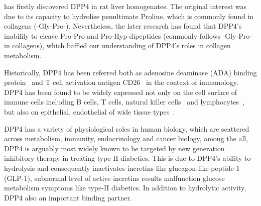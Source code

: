 \citet{Hopsu-Havu1966} has firstly discovered DPP4 in rat liver homogenates. The original interest was due to its capacity to hydrolise penultimate Proline, which is commonly found in collagens (-Gly-Pro-). Nevertheless, the later research has found that DPP4's inabilily to cleave Pro-Pro and Pro-Hyp dipeptides (commonly follows -Gly-Pro- in collagens), which baffled our understanding of DPP4's roles in collagen metabolism.
\par
Historically, DPP4 has been referred both as adenosine deaminase (ADA) binding protein~\cite{Kameoka_1993} and T cell activation antigen CD26~\cite{Fleischer_1994} in the context of immunology. DPP4 has been found to be widely expressed not only on the cell surface of immune cells including B cells, T cells, natural killer cells~\cite{Fleischer1987,Fleischer1988,Gorrell1991,Capuani2018,Bühling1994,Bühling1995} and lymphocytes~\cite{Gorvel1991}, but also on epithelial, endothelial of wide tissue types~\cite{Gorrell2001}. 
\par 
DPP4 has a variety of physiological roles in human biology, which are scattered across metabolism, immunity, endocrinology and cancer biology, among the all, DPP4 is arguably most widely known to be targeted by new generation inhibitory therapy in treating type II diabetics. This is due to DPP4's ability to hydrolysis and consequently inactivates incretins like glucagon-like peptide-1 (GLP-1), subnormal level of active incretins results malfunction glucose metabolism symptoms like type-II diabetics. In addition to hydrolytic activity, DPP4 also an important binding partner. 
\par 

